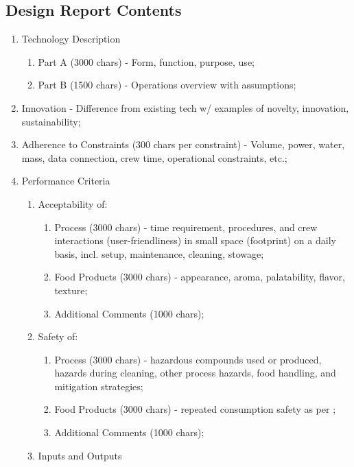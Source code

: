 \documentclass{report}
\begin{document}
\begin{appendices}
\subsection{Design Report Contents}
\label{sec:reportcontents}

\begin{enumerate}
    \item Technology Description
    \begin{enumerate}
        \item Part A (3000 chars) - Form, function, purpose, use;
        \item Part B (1500 chars) - Operations overview with assumptions;
    \end{enumerate}
    \item Innovation - Difference from existing tech w/ examples of novelty, innovation, sustainability;
    \item Adherence to Constraints (300 chars per constraint) - Volume, power, water, mass, data connection, crew time, operational constraints, etc.;
    \item Performance Criteria
    \begin{enumerate}
        \item Acceptability of:
        \begin{enumerate}
            \item Process (3000 chars) - time requirement, procedures, and crew interactions (user-friendliness) in small space (footprint) on a daily basis, incl. setup, maintenance, cleaning, stowage;
            \item Food Products (3000 chars) - appearance, aroma, palatability, flavor, texture;
            \item Additional Comments (1000 chars);
        \end{enumerate}
        \item Safety of:
        \begin{enumerate}
            \item Process (3000 chars) - hazardous compounds used or produced, hazards during cleaning, other process hazards, food handling, and mitigation strategies;
            \item Food Products (3000 chars) - repeated consumption safety as per \cite{nutrition};
            \item Additional Comments (1000 chars);
        \end{enumerate}
        \item Inputs and Outputs
        \begin{enumerate}

\end{enumerate}
\end{enumerate}
\end{enumerate}
\end{appendices}
\end{document}
